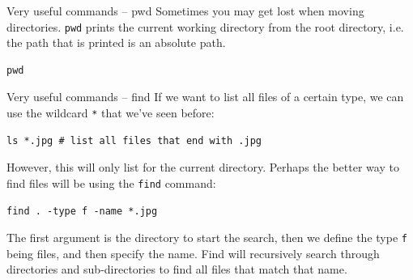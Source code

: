 \documentclass[10pt]{beamer}
\begin{document}
\begin{frame}[label={sec:org83c0d89},fragile]{Very useful commands -- pwd}
 Sometimes you may get lost when moving directories. \texttt{pwd} prints the current
working directory from the root directory, i.e. the path that is printed is an
absolute path.

\begin{verbatim}
pwd
\end{verbatim}
\end{frame}

\begin{frame}[label={sec:org77ccedb},fragile]{Very useful commands -- find}
 If we want to list all files of a certain type, we can use the wildcard \texttt{*} that
we've seen before:

\begin{verbatim}
ls *.jpg # list all files that end with .jpg
\end{verbatim}

However, this will only list for the current directory. Perhaps the better way
to find files will be using the \texttt{find} command:

\begin{verbatim}
find . -type f -name *.jpg
\end{verbatim}

The first argument is the directory to start the search, then we define the type
\texttt{f} being files, and then specify the name. Find will recursively search through
directories and sub-directories to find all files that match that name.
\end{frame}
\end{document}
